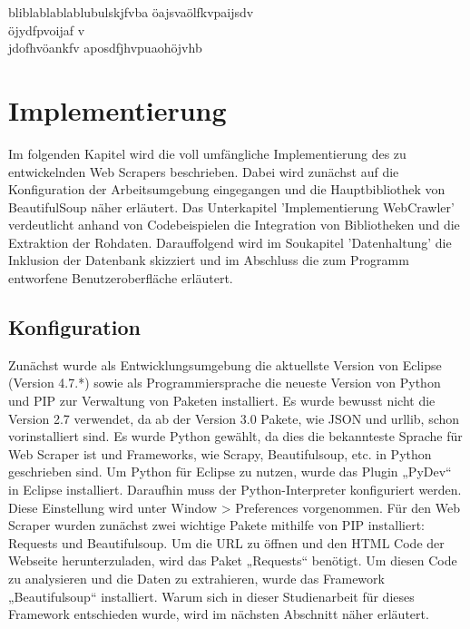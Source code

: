 \documentclass[a4paper,oneside,12pt]{report}
\begin{document}
		bliblablablablubulskjfvba
		öajsvaölfkvpaijsdv
		\\
		öjydfpvoijaf
		v\\jdofhvöankfv
		aposdfjhvpuaohöjvhb
	
	
	
	\chapter{Implementierung}
		
		Im folgenden Kapitel wird die voll umfängliche Implementierung des zu entwickelnden Web Scrapers beschrieben. Dabei wird zunächst auf die Konfiguration der Arbeitsumgebung eingegangen und die Hauptbibliothek von BeautifulSoup näher erläutert. Das Unterkapitel 'Implementierung WebCrawler' verdeutlicht anhand von Codebeispielen die Integration von Bibliotheken und die Extraktion der Rohdaten. Darauffolgend wird im Soukapitel 'Datenhaltung' die Inklusion der Datenbank skizziert und im Abschluss die zum Programm entworfene Benutzeroberfläche erläutert.
	
		\section{Konfiguration}
		
			Zunächst wurde als Entwicklungsumgebung die aktuellste Version von Eclipse (Version 4.7.*) sowie als Programmiersprache die neueste Version von Python und PIP zur Verwaltung von Paketen installiert. Es wurde bewusst nicht die Version 2.7 verwendet, da ab der Version 3.0 Pakete, wie JSON und urllib, schon vorinstalliert sind. Es wurde Python gewählt, da dies die bekannteste Sprache für Web Scraper ist und Frameworks, wie Scrapy, Beautifulsoup, etc. in Python geschrieben sind. 
			\newline
			Um Python für Eclipse zu nutzen, wurde das Plugin „PyDev“ in Eclipse installiert. Daraufhin muss der Python-Interpreter konfiguriert werden. Diese Einstellung wird unter Window > Preferences vorgenommen. \cite{bib-pipEnv}
			\newline
			Für den Web Scraper wurden zunächst zwei wichtige Pakete mithilfe von PIP installiert: Requests und Beautifulsoup.
			Um die URL zu öffnen und den HTML Code der Webseite herunterzuladen, wird das Paket „Requests“ benötigt. Um diesen Code zu analysieren und die Daten zu extrahieren, wurde das Framework „Beautifulsoup“ installiert. \cite{bib-scrapeHero} 
			Warum sich in dieser Studienarbeit für dieses Framework entschieden wurde, wird im nächsten Abschnitt näher erläutert. 
\end{document}
